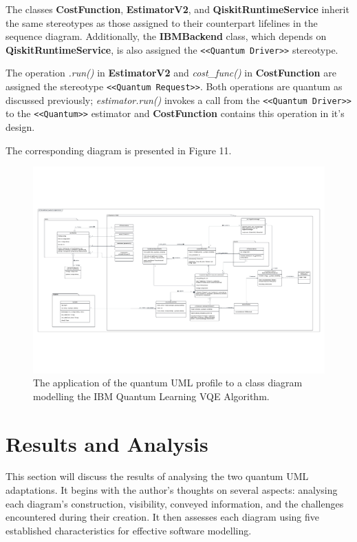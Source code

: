 \documentclass{article}
\begin{document}
The classes \textbf{CostFunction}, \textbf{EstimatorV2}, and \textbf{QiskitRuntimeService} inherit the same stereotypes as those assigned to their counterpart lifelines in the sequence diagram. Additionally, the \textbf{IBMBackend} class, which depends on \textbf{QiskitRuntimeService}, is also assigned the \texttt{<<Quantum Driver>>} stereotype.

The operation \textit{.run()} in \textbf{EstimatorV2} and \textit{cost\_func()} in \textbf{CostFunction} are assigned the stereotype \texttt{<<Quantum Request>>}. Both operations are quantum as discussed previously; \textit{estimator.run()} invokes a call from the \texttt{<<Quantum Driver>>} to the \texttt{<<Quantum>>} estimator and \textbf{CostFunction} contains this operation in it's design.

The corresponding diagram is presented in Figure 11.

\begin{figure}
    \centering
    \includegraphics[width=1\linewidth]{VQE UML Profile CD Final Version.pdf}
    \caption{The application of the quantum UML profile to a class diagram modelling the IBM Quantum Learning VQE Algorithm.}
    \label{fig:QUMLP_CD}
\end{figure}

\section{Results and Analysis}

This section will discuss the results of analysing the two quantum UML adaptations. It begins with the author's thoughts on several aspects: analysing each diagram's construction, visibility, conveyed information, and the challenges encountered during their creation. It then assesses each diagram using five established characteristics for effective software modelling. 
\end{document}
